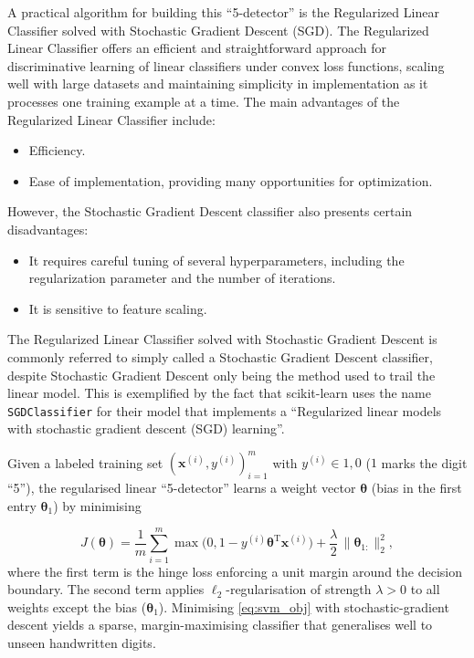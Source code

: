 \documentclass[12pt,letter]{article}
\begin{document}
A practical algorithm for building this ``5-detector'' is the Regularized Linear Classifier solved with Stochastic Gradient Descent (SGD). The Regularized Linear Classifier offers an efficient and straightforward approach for discriminative learning of linear classifiers under convex loss functions, scaling well with large datasets and maintaining simplicity in implementation as it processes one training example at a time. The main advantages of the Regularized Linear Classifier include:
\begin{itemize}
\item Efficiency.
\item Ease of implementation, providing many opportunities for optimization.
\end{itemize}
However, the Stochastic Gradient Descent classifier also presents certain disadvantages:
\begin{itemize}
\item It requires careful tuning of several hyperparameters, including the regularization parameter and the number of iterations.
\item It is sensitive to feature scaling.
\end{itemize}

\begin{mdframed}[middlelinewidth=0.5mm]
\begin{center}
\end{center}
The Regularized Linear Classifier solved with Stochastic Gradient Descent is commonly referred to simply called a Stochastic Gradient Descent classifier, despite Stochastic Gradient Descent only being the method used to trail the linear model. This is exemplified by the fact that scikit-learn uses the name \texttt{SGDClassifier} for their model that implements a ``Regularized linear models with stochastic gradient descent (SGD) learning''. 
\end{mdframed}


Given a labeled training set ${(\mathbf x^{(i)},y^{(i)})}_{i=1}^m$ with
$y^{(i)}\in{1,0}$ ($1$ marks the digit ``5''), the regularised linear ``5-detector'' learns a weight vector $\boldsymbol{\theta}$ (bias in the first entry $\boldsymbol{\theta}_1$) by minimising

\begin{equation}
\label{eq:svm_obj}
J(\boldsymbol{\theta}) =
\frac{1}{m}\sum_{i=1}^{m}
\max \bigl(0,1-y^{(i)}\boldsymbol{\theta}^{\text{T}}\mathbf x^{(i)}\bigr)
+ \frac{\lambda}{2}\,\bigl\lVert\boldsymbol{\theta}_{1:}\bigr\rVert_2^{2},
\end{equation}
where the first term is the hinge loss enforcing a unit margin around the decision boundary. The second term applies $\ell_2$-regularisation of strength $\lambda>0$ to all weights except the bias ($\boldsymbol{\theta}_{1}$). Minimising \eqref{eq:svm_obj} with stochastic-gradient descent yields a sparse, margin-maximising classifier that generalises well to unseen handwritten digits.
\end{document}
